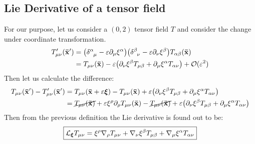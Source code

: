 \subsection{Lie Derivative of a tensor field}
For our purpose, let us consider a $(0,2)$ tensor field $T$ and consider the change under coordinate transformation.
\begin{align*}
    T'_{\mu\nu}(\fvec{x}') &= \qty(\tensor{\delta}{^\alpha _\mu}-\varepsilon \partial_{\mu}\xi^\alpha)\qty(\tensor{\delta}{^\beta _\nu}-\varepsilon \partial_{\nu}\xi^\beta)T_{\alpha\beta}(\fvec{x})\\
    &=T_{\mu\nu}(\fvec{x}) -\varepsilon\qty(\partial_{\nu}\xi^\beta T_{\mu\beta} + \partial_{\mu}\xi^\alpha T_{\alpha\nu}) + \SO(\varepsilon^2)
\end{align*}
Then let us calculate the difference:
\begin{align*}
   T_{\mu\nu}(\vb{\bar{x}}') -T'_{\mu\nu}(\vb{\bar{x}}') &=  T_{\mu\nu}(\vb{\bar{x}}+\varepsilon \boldsymbol{\xi}) - T_{\mu\nu}(\vb{\bar{x}}) +\varepsilon\qty(\partial_{\nu}\xi^\beta T_{\mu\beta} + \partial_{\mu}\xi^\alpha T_{\alpha\nu})\\
   &=\cancel{T_{\mu\nu}(\vb{\bar{x}})} +\varepsilon \xi^\rho \partial_\rho T_{\mu\nu}(\vb{\bar{x}}) -\cancel{T_{\mu\nu}(\vb{\bar{x}})} +\varepsilon\qty(\partial_{\nu}\xi^\beta T_{\mu\beta} + \partial_{\mu}\xi^\alpha T_{\alpha\nu})
\end{align*}
Then from the previous definition the Lie derivative is found out to be:
\begin{align*}
   \boxed{ \mathcal L_{\boldsymbol{\xi}}T_{\mu\nu} =\xi^\rho \nabla_{\rho} T_{\mu\nu} + \nabla_{\nu}\xi^\beta T_{\mu\beta} + \nabla_{\mu}\xi^\alpha T_{\alpha\nu}}
\end{align*}
